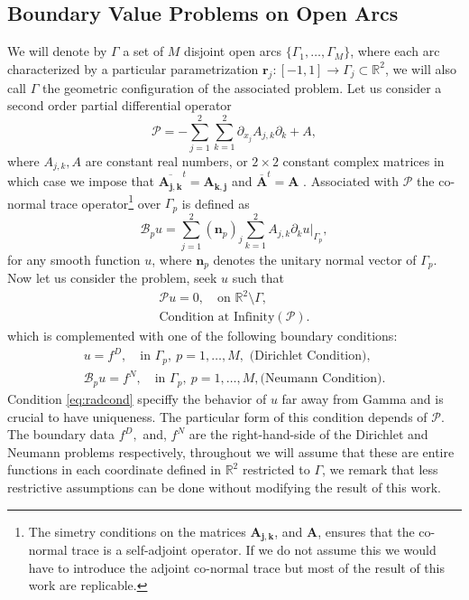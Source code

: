\documentclass{article}
\newcommand{\cB}{\mathcal B}
\newcommand{\IR}{{\mathbb R}}
\newcommand{\cP}{\mathcal{P}}
\newcommand{\bn}{\bm{n}}
\newcommand{\br}{\bm{r}}
\begin{document}
\subsection{Boundary Value Problems on Open Arcs}
\label{sec:bvproblem}
We will denote by $\Gamma$ a set of $M$ disjoint open arcs $ \{ \Gamma_1, \hdots, \Gamma_M\}$, where  each arc characterized by a particular parametrization $\br_j :[-1,1] \rightarrow \Gamma_j \subset \IR^2$, we will also call $\Gamma$ the geometric configuration of the associated problem. Let us consider a second order partial differential operator 
$$\cP = - \sum_{j=1}^2 \sum_{k=1}^2 \partial_{x_j}{A_{j,k}} \partial_k  + {A},$$
where ${A_{j,k}},{A}$ are constant real numbers, or $2\times 2$ constant complex matrices in which case we impose that $\overline{\mathbf{A_{j,k}}}^t = \mathbf{A_{k,j}}$ and $\overline{\mathbf{A}}^t = \mathbf{A}$ . Associated with $\cP$ the co-normal trace operator\footnote{The simetry conditions on the matrices $\mathbf{A_{j,k}}$, and $\mathbf{A}$, ensures that the co-normal trace is a self-adjoint operator. If we do not assume this we would have to introduce the adjoint co-normal trace but most of the result of this work are replicable.} over $\Gamma_p$ is defined as 
$$
\cB_p u =  \sum_{j=1}^2 (\bn_p)_j \sum_{k=1}^2 {A}_{j,k} \partial_k u \vert_{\Gamma_p},
$$
for any smooth function $u$, where $\bn_p$ denotes the unitary normal vector of $\Gamma_p$. Now let us consider the problem, seek $u$ such that 
\begin{align}
\label{eq:volprob}
\cP u = 0, \quad \text{on } \IR^2 \setminus \Gamma,\\
\label{eq:radcond}
\text{Condition at Infinity}(\cP). 
\end{align}
which is complemented with one of the following boundary conditions:  
\begin{align}
\label{eq:dircond}
u = f^D,   \quad \text{in } \Gamma_p, \ p =1,\hdots,M,  \text{ (Dirichlet Condition)},\\
\label{eq:neumanncond}
 \cB_p u = f^N,  \quad \text{in } \Gamma_p, \ p =1,\hdots,M,  \text{(Neumann Condition)}.
\end{align}
Condition \eqref{eq:radcond} speciffy the behavior of $u$ far away from Gamma and is crucial to have uniqueness. The particular form of this condition depends of $\cP$. The boundary data $f^D,$ and, $f^N$ are the right-hand-side of the Dirichlet and Neumann problems respectively, throughout we will assume that these are entire functions in each coordinate defined in $\IR^2$ restricted to $\Gamma$, we remark that less restrictive assumptions can be done without modifying the result of this work.
\end{document}
